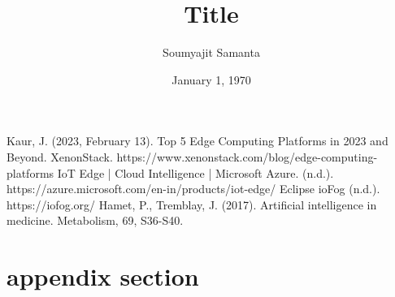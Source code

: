 \documentclass[
    doc,
    a4paper,
    draftall,
]{apa6}
\title{Title}
\author{Soumyajit Samanta}
\affiliation{University}
\date{January 1, 1970}
\begin{document}
\maketitle

\tableofcontents
\newpage
\listoffigures
\newpage
\listoftables

\newpage


\begin{thebibliography}{9}
    Kaur, J. (2023, February 13). Top 5 Edge Computing Platforms in 2023 and Beyond. XenonStack. https://www.xenonstack.com/blog/edge-computing-platforms
    IoT Edge | Cloud Intelligence | Microsoft Azure. (n.d.). https://azure.microsoft.com/en-in/products/iot-edge/
    Eclipse ioFog (n.d.). https://iofog.org/
    Hamet, P., Tremblay, J. (2017). Artificial intelligence in medicine. Metabolism, 69, S36-S40.
\end{thebibliography}

\appendix
\section{appendix section}
\end{document}
